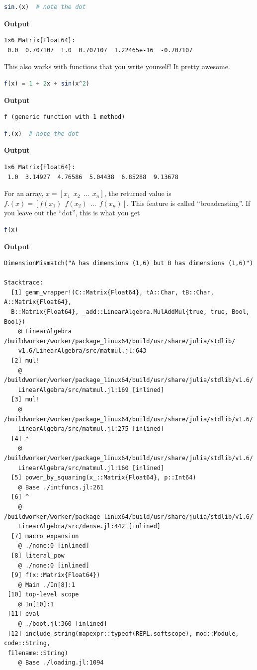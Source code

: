 \begin{lstlisting}[language=Julia,style=mystyle]
sin.(x)  # note the dot
\end{lstlisting}
\textbf{Output} 
\begin{verbatim}
1×6 Matrix{Float64}:
 0.0  0.707107  1.0  0.707107  1.22465e-16  -0.707107
\end{verbatim}

This also works with functions that you write yourself! It pretty awesome.

\begin{lstlisting}[language=Julia,style=mystyle]
f(x) = 1 + 2x + sin(x^2)
\end{lstlisting}
\textbf{Output} 
\begin{verbatim}
f (generic function with 1 method)
\end{verbatim}

\begin{lstlisting}[language=Julia,style=mystyle]
f.(x)  # note the dot
\end{lstlisting}
\textbf{Output} 
\begin{verbatim}
1×6 Matrix{Float64}:
 1.0  3.14927  4.76586  5.04438  6.85288  9.13678
\end{verbatim}

For an array,  $x = [x_1 ~~ x_2 ~~\ldots~~ x_n ]$, the returned value is $f.(x)=[f(x_1)~~  f(x_2)~~ \ldots ~~f(x_n)]$. This feature is called ``broadcasting''. If you leave out the ``dot'', this is what you get

\begin{lstlisting}[language=Julia,style=mystyle]
f(x)
\end{lstlisting}
\textbf{Output} 
\begin{verbatim}
DimensionMismatch("A has dimensions (1,6) but B has dimensions (1,6)")

Stacktrace:
  [1] gemm_wrapper!(C::Matrix{Float64}, tA::Char, tB::Char, A::Matrix{Float64},
  B::Matrix{Float64}, _add::LinearAlgebra.MulAddMul{true, true, Bool, Bool})
    @ LinearAlgebra /buildworker/worker/package_linux64/build/usr/share/julia/stdlib/
    v1.6/LinearAlgebra/src/matmul.jl:643
  [2] mul!
    @ /buildworker/worker/package_linux64/build/usr/share/julia/stdlib/v1.6/
    LinearAlgebra/src/matmul.jl:169 [inlined]
  [3] mul!
    @ /buildworker/worker/package_linux64/build/usr/share/julia/stdlib/v1.6/
    LinearAlgebra/src/matmul.jl:275 [inlined]
  [4] *
    @ /buildworker/worker/package_linux64/build/usr/share/julia/stdlib/v1.6/
    LinearAlgebra/src/matmul.jl:160 [inlined]
  [5] power_by_squaring(x_::Matrix{Float64}, p::Int64)
    @ Base ./intfuncs.jl:261
  [6] ^
    @ /buildworker/worker/package_linux64/build/usr/share/julia/stdlib/v1.6/
    LinearAlgebra/src/dense.jl:442 [inlined]
  [7] macro expansion
    @ ./none:0 [inlined]
  [8] literal_pow
    @ ./none:0 [inlined]
  [9] f(x::Matrix{Float64})
    @ Main ./In[8]:1
 [10] top-level scope
    @ In[10]:1
 [11] eval
    @ ./boot.jl:360 [inlined]
 [12] include_string(mapexpr::typeof(REPL.softscope), mod::Module, code::String,
 filename::String)
    @ Base ./loading.jl:1094

\end{verbatim}

